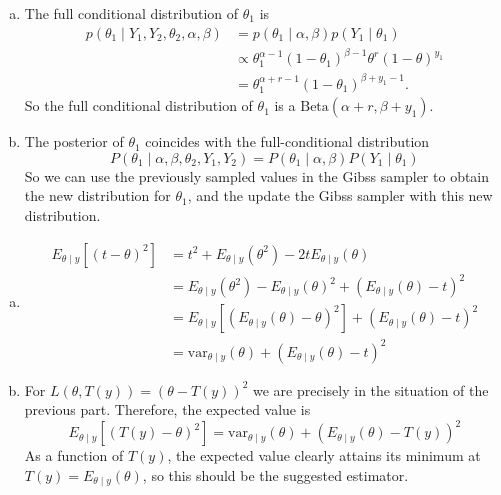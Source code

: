 \documentclass{article}
\theoremstyle{plain}
\theoremstyle{definition}
\newenvironment{exercise}[1]
  {\renewcommand\theexerciseaux{#1}\exerciseaux\label{ejer:#1}}
  {\endexerciseaux}
\newenvironment{sol}{\begin{trivlist}
 \item[\hskip \labelsep {\textit{Solution}.}\hskip \labelsep]}{\end{trivlist}}
\begin{document}
\begin{sol}
\begin{enumerate}[(a)]
\item The full conditional distribution of $\theta_1$ is
\begin{align*}
p(\theta_1\mid Y_1,Y_2,\theta_2,\alpha,\beta)&=p(\theta_1\mid \alpha,\beta)p(Y_1\mid \theta_1)\\
&\propto \theta_1^{\alpha-1}(1-\theta_1)^{\beta-1}\theta^r(1-\theta)^{y_1}\\
&=\theta_1^{\alpha+r-1}(1-\theta_1)^{\beta+y_1-1}.
\end{align*}
So the full conditional distribution of $\theta_1$ is a $\mathrm{Beta}(\alpha+r,\beta+y_1)$.
\item The posterior of $\theta_1$ coincides with the full-conditional distribution 
\[
P(\theta_1\mid \alpha,\beta,\theta_2,Y_1,Y_2)=P(\theta_1\mid\alpha,\beta)P(Y_1\mid\theta_1)
\]
So we can use the previously sampled values in the Gibss sampler to obtain the new distribution for $\theta_1$, and the update the Gibss sampler with this new distribution.
\end{enumerate}

\end{sol}


\begin{exercise}{B3}
\end{exercise}
\begin{sol}
\begin{enumerate}[(a)]
\item 
\begin{align*}
E_{\theta\mid y}\left[(t-\theta)^2\right] & = t^2 + E_{\theta\mid y}(\theta^2)-2tE_{\theta\mid y}(\theta)\\
& =  E_{\theta\mid y}(\theta^2) -  E_{\theta\mid y}(\theta)^2+ \left(E_{\theta\mid y}(\theta)-t\right)^2\\
& =  E_{\theta\mid y}\left[ (E_{\theta\mid y}(\theta)-\theta)^2\right]+\left(E_{\theta\mid y}(\theta)-t\right)^2\\
& = \mathrm{var}_{\theta\mid y}(\theta)+\left(E_{\theta\mid y}(\theta)-t\right)^2
\end{align*}
\item For $L(\theta,T(y))=(\theta-T(y))^2$ we are precisely in the situation of the previous part. Therefore, the expected value is
\[
E_{\theta\mid y}\left[(T(y)-\theta)^2\right] = \mathrm{var}_{\theta\mid y}(\theta)+\left(E_{\theta\mid y}(\theta)-T(y)\right)^2
\]
As a function of $T(y)$, the expected value clearly attains its minimum at $T(y) = E_{\theta\mid y}(\theta)$, so this should be the suggested estimator.
\end{enumerate}
\end{sol}
\end{document}
